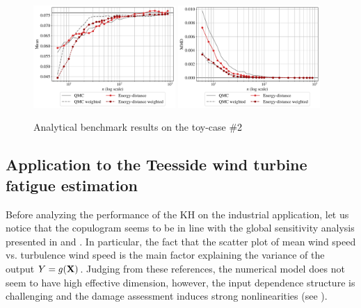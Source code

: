 \begin{figure}[!h]
\begin{center}
    \includegraphics[width=0.48\textwidth]{part2/figures/DCE/analytical_bench/GSobol_10D_(normal_input)_convergence_ED.pdf}
    \includegraphics[width=0.48\textwidth]{part2/figures/DCE/analytical_bench/GSobol_10D_(normal_input)_convergence_MMD_ED.pdf}\\
\end{center}
\caption{Analytical benchmark results on the toy-case \#2} \label{fig:toy-case2}
\end{figure}

\subsection{Application to the Teesside wind turbine fatigue estimation}

Before analyzing the performance of the KH on the industrial application, let us notice that the copulogram  seems to be in line with the global sensitivity analysis presented in \cite{murcia_dimitrov_2018} and \cite{li_zhan_2020}. 
In particular, the fact that the scatter plot of mean wind speed vs. turbulence wind speed is the main factor explaining the variance of the output $Y=g({\bf X})$. 
Judging from these references, the numerical model does not seem to have high effective dimension, however, the input dependence structure is challenging and the damage assessment induces strong nonlinearities (see ). 

